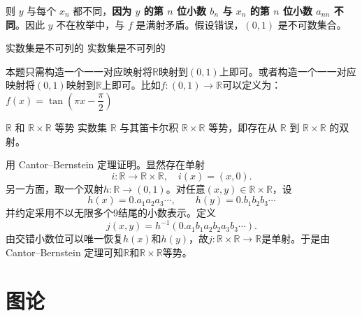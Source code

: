 \documentclass[lang=cn,11pt]{elegantbook}
\begin{document}
则 $y$ 与每个 $x_n$ 都不同，\textbf{因为 $y$ 的第 $n$ 位小数 $b_n$ 与 $x_n$ 的第 $n$ 位小数 $a_{nn}$ 不同}。因此 $y$ 不在枚举中，与 $f$ 是满射矛盾。假设错误，$(0,1)$ 是不可数集合。
\begin{theorem}{实数集是不可列的}
实数集是不可列的
\end{theorem}
本题只需构造一个一一对应映射将$\mathbb{R}$映射到$(0,1)$上即可。或者构造一个一一对应映射将$(0,1)$映射到$\mathbb{R}$上即可。比如$f: (0,1) \to \mathbb{R}$可以定义为：$f(x)=\tan\left(\pi x-\dfrac{\pi}{2}\right)$
\begin{theorem}{$\mathbb{R}$ 和 $\mathbb{R} \times \mathbb{R}$ 等势}{}
    实数集 $\mathbb{R}$ 与其笛卡尔积 $\mathbb{R} \times \mathbb{R}$ 等势，即存在从 $\mathbb{R}$ 到 $\mathbb{R} \times \mathbb{R}$ 的双射。
\end{theorem}
用 Cantor--Bernstein 定理证明。显然存在单射
\[
i:\mathbb{R}\to\mathbb{R}\times\mathbb{R},\quad i(x)=(x,0).
\]
另一方面，取一个双射$h:\mathbb{R}\to(0,1)$。对任意$(x,y)\in\mathbb{R}\times\mathbb{R}$，设
\[
h(x)=0.a_1a_2a_3\cdots,\qquad h(y)=0.b_1b_2b_3\cdots
\]
并约定采用不以无限多个9结尾的小数表示。定义
\[
j(x,y)=h^{-1}(0.a_1b_1a_2b_2a_3b_3\cdots).
\]
由交错小数位可以唯一恢复$h(x)$和$h(y)$，故$j:\mathbb{R}\times\mathbb{R}\to\mathbb{R}$是单射。于是由 Cantor--Bernstein 定理可知$\mathbb{R}$和$\mathbb{R}\times\mathbb{R}$等势。


\chapter{图论}
\end{document}
